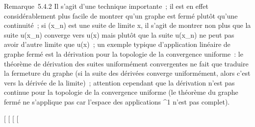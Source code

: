 \documentclass[]{article}
\begin{document}
Remarque~5.4.2 Il s'agit d'une technique importante~; il est en effet
considérablement plus facile de montrer qu'un graphe est fermé plutôt
qu'une continuité~; si (x_n) est une suite de limite x, il
s'agit de montrer non plus que la suite u(x_n) converge vers
u(x) mais plutôt que la suite u(x_n) ne peut pas avoir d'autre
limite que u(x)~; un exemple typique d'application linéaire de graphe
fermé est la dérivation pour la topologie de la convergence uniforme~:
le théorème de dérivation des suites uniformément convergentes ne fait
que traduire la fermeture du graphe (si la suite des dérivées converge
uniformément, alors c'est vers la dérivée de la limite)~; attention
cependant que la dérivation n'est pas continue pour la topologie de la
convergence uniforme (le théorème du graphe fermé ne s'applique pas car
l'espace des applications ^1 n'est pas complet).

[
[
[
[
\end{document}
